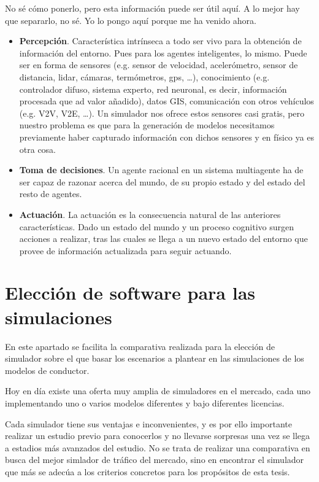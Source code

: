 No sé cómo ponerlo, pero esta información puede ser útil aquí. A lo mejor hay que separarlo, no sé. Yo lo pongo aquí porque me ha venido ahora.

\begin{itemize}
	\item \textbf{Percepción}. Característica intrínseca a todo ser vivo para la obtención de información del entorno. Pues para los agentes inteligentes, lo mismo. Puede ser en forma de sensores (e.g. sensor de velocidad, acelerómetro, sensor de distancia, lidar, cámaras, termómetros, gps, \ldots), conocimiento (e.g. controlador difuso, sistema experto, red neuronal, es decir, información procesada que ad valor añadido), datos GIS, comunicación con otros vehículos (e.g. V2V, V2E, \ldots). Un simulador nos ofrece estos sensores casi gratis, pero nuestro problema es que para la generación de modelos necesitamos previamente haber capturado información con dichos sensores y en físico ya es otra cosa.
	\item \textbf{Toma de decisiones}. Un agente racional en un sistema multiagente ha de ser capaz de razonar acerca del mundo, de su propio estado y del estado del resto de agentes.
	\item \textbf{Actuación}. La actuación es la consecuencia natural de las anteriores características. Dado un estado del mundo y un proceso cognitivo surgen acciones a realizar, tras las cuales se llega a un nuevo estado del entorno que provee de información actualizada para seguir actuando.
\end{itemize}

\section{Elección de software para las simulaciones}

En este apartado se facilita la comparativa realizada para la elección de simulador sobre el que basar los escenarios a plantear en las simulaciones de los modelos de conductor.

Hoy en día existe una oferta muy amplia de simuladores en el mercado, cada uno implementando uno o varios modelos diferentes y bajo diferentes licencias.

Cada simulador tiene sus ventajas e inconvenientes, y es por ello importante realizar un estudio previo para conocerlos y no llevarse sorpresas una vez se llega a estadios más avanzados del estudio. No se trata de realizar una comparativa en busca del mejor simlador de tráfico del mercado, sino en encontrar el simulador que más se adecúa a los criterios concretos para los propósitos de esta tesis.


